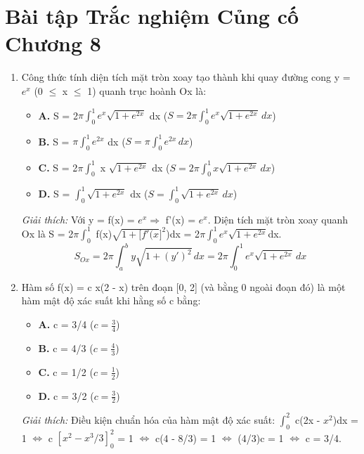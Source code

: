 \documentclass[11pt,a4paper,oneside]{book}
\begin{document}
\section{Bài tập Trắc nghiệm Củng cố Chương 8}
\begin{enumerate}[label=\textbf{Câu \arabic*:}, leftmargin=2.2em, itemsep=8pt]
  \item Công thức tính diện tích mặt tròn xoay tạo thành khi quay đường cong y = $e^x$ (0 $\le$  x $\le$  1) quanh trục hoành Ox là:
  \begin{itemize}[label={}, leftmargin=1em, itemsep=2pt]
    \item \textbf{A.} S = 2$\pi \int_0^1 e^x \sqrt{1 + e^{2x}}$ dx \quad ($S = 2\pi \int_0^1 e^x \sqrt{1 + e^{2x}}\,dx$)
    \item \textbf{B.} S = $\pi \int_0^1 e^{2x}$ dx \quad ($S = \pi \int_0^1 e^{2x}\,dx$)
    \item \textbf{C.} S = 2$\pi \int_0^1$ x $\sqrt{1 + e^{2x}}$ dx \quad ($S = 2\pi \int_0^1 x \sqrt{1 + e^{2x}}\,dx$)
    \item \textbf{D.} S = $\int_0^1 \sqrt{1 + e^{2x}}$ dx \quad ($S = \int_0^1 \sqrt{1 + e^{2x}}\,dx$)
  \end{itemize}
  \vspace{2pt}
   \textit{Giải thích:} Với y = f(x) = $e^x \Rightarrow$  f'(x) = $e^x$. Diện tích mặt tròn xoay quanh Ox là S = 2$\pi \int_0^1$ f(x)$\sqrt{1 + [f'(x} ]^2$)dx = 2$\pi \int_0^1 e^x \sqrt{1 + e^{2x}}$dx.
  \[ S_{Ox} = 2\pi \int_a^b y\sqrt{1+(y')^2}\,dx = 2\pi \int_0^1 e^x\sqrt{1+e^{2x}}\,dx \]
  \item Hàm số f(x) = c x(2 - x) trên đoạn [0, 2] (và bằng 0 ngoài đoạn đó) là một hàm mật độ xác suất khi hằng số c bằng:
  \begin{itemize}[label={}, leftmargin=1em, itemsep=2pt]
    \item \textbf{A.} c = 3/4 \quad ($c = \frac{3}{4}$)
    \item \textbf{B.} c = 4/3 \quad ($c = \frac{4}{3}$)
    \item \textbf{C.} c = 1/2 \quad ($c = \frac{1}{2}$)
    \item \textbf{D.} c = 3/2 \quad ($c = \frac{3}{2}$)
  \end{itemize}
  \vspace{2pt}
   \textit{Giải thích:} Điều kiện chuẩn hóa của hàm mật độ xác suất: $\int_0^2$ c(2x - $x^2$)dx = 1 $\iff$  c $[x^2 - x^3 / 3]_0^2$ = 1 $\iff$  c(4 - 8/3) = 1 $\iff$  (4/3)c = 1 $\iff$  c = 3/4.

\end{enumerate}
\end{document}
